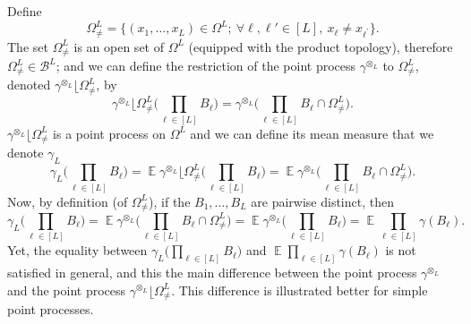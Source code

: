 \documentclass[twoside,11pt]{book}
\numberwithin{theorem}{chapter}
\numberwithin{definition}{chapter}
\numberwithin{proposition}{chapter}
\numberwithin{corollary}{chapter}
\numberwithin{example}{chapter}
\numberwithin{lemma}{chapter}
\DeclareMathOperator{\EX}{\mathbb{E}}
\begin{document}
Define 
\begin{equation}
\Omega_{\neq}^{L} = \{ (x_{1}, \dots, x_{L}) \in \Omega^{L}; \: \forall \ell,\ell' \in [L], \: x_{\ell} \neq x_{\ell^{'}} \}.
\end{equation}
The set $\Omega_{\neq}^{L}$ is an open set of $\Omega^{L}$ (equipped with the product topology), therefore $\Omega_{\neq}^{L} \in \mathcal{B}^{L}$; and we can define the restriction of the point process $\gamma^{\otimes_L}$ to $\Omega_{\neq}^{L}$, denoted $\gamma^{\otimes_{L}} \lfloor \Omega_{\neq}^{L}$, by
\begin{equation}
\gamma^{\otimes_{L}} \lfloor \Omega_{\neq}^{L} \big(\prod\limits_{\ell \in [L]} B_\ell \big) = \gamma^{\otimes_{L}} \big( \prod\limits_{\ell \in [L]} B_\ell \cap \Omega_{\neq}^{L}   \big).
\end{equation}
$\gamma^{\otimes_{L}} \lfloor \Omega_{\neq}^{L}$ is a point process on $\Omega^L$ and we can define its mean measure that we denote $\gamma_L$ 
\begin{equation}
\gamma_{L} \big(\prod\limits_{\ell \in [L]} B_{\ell} \big)  = \EX \gamma^{\otimes_{L}} \lfloor \Omega_{\neq}^{L} \big( \prod\limits_{\ell \in [L]} B_{\ell} \big) = \EX \gamma^{\otimes_{L}} \big( \prod\limits_{\ell \in [L]} B_\ell \cap \Omega_{\neq}^{L}   \big).
\end{equation}
Now, by definition (of $\Omega_{\neq}^{L}$), if the $B_{1}, \dots, B_L$ are pairwise distinct, then 
\begin{equation}
\gamma_{L} \big(\prod\limits_{\ell \in [L]} B_{\ell} \big) = \EX \gamma^{\otimes_{L}} \big( \prod\limits_{\ell \in [L]} B_\ell \cap \Omega_{\neq}^{L}   \big) = \EX \gamma^{\otimes_{L}} \big( \prod\limits_{\ell \in [L]} B_{\ell} \big)  = \EX \prod\limits_{\ell \in [L]} \gamma(B_\ell).
\end{equation} 
Yet, the equality between $\gamma_{L} \big(\prod\limits_{\ell \in [L]} B_{\ell} \big)$ and $\EX \prod\limits_{\ell \in [L]} \gamma(B_\ell)$ is not satisfied in general, and this the main difference between the point process $\gamma^{\otimes_{L}}$ and the point process $\gamma^{\otimes_{L}} \lfloor \Omega_{\neq}^{L}$. This difference is illustrated better for simple point processes.
\end{document}
